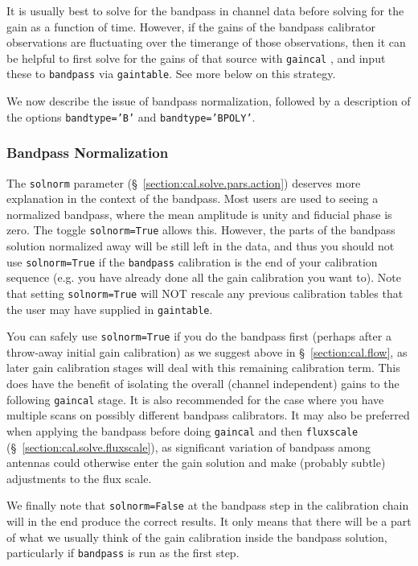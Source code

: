 It is usually best to solve for the bandpass in channel data before
solving for the gain as a function of time.  However, if the gains of
the bandpass calibrator observations are fluctuating over the
timerange of those observations, then it can be helpful to first solve
for the gains of that source with {\tt gaincal} , and input these to
{\tt bandpass} via {\tt gaintable}.  See more below on this strategy.

We now describe the issue of bandpass normalization, followed by
a description of the options {\tt bandtype='B'} and {\tt bandtype='BPOLY'}.

\subsubsection{Bandpass Normalization}
\label{section:cal.solve.band.solnorm}

The {\tt solnorm} parameter (\S~\ref{section:cal.solve.pars.action})
deserves more explanation in the context of the bandpass.  Most users
are used to seeing a normalized bandpass, where the mean amplitude
is unity and fiducial phase is zero. 
The toggle {\tt solnorm=True} allows this.  However, the parts of the
bandpass solution normalized away will be still left in the data,
and thus you should not use {\tt solnorm=True} if the {\tt bandpass}
calibration is the end of your calibration sequence (e.g. you have
already done all the gain calibration you want to).  Note that
setting {\tt solnorm=True} will NOT rescale any previous calibration
tables that the user may have supplied in {\tt gaintable}.

You can safely use {\tt solnorm=True} if you do the bandpass first
(perhaps after a throw-away initial gain calibration) as we suggest above in
\S~\ref{section:cal.flow}, as later gain calibration stages will deal with this
remaining calibration term.  This does have the benefit of isolating
the overall (channel independent) gains to the following {\tt gaincal}
stage.  It is also recommended for the case where you have multiple
scans on possibly different bandpass calibrators.  It may also be 
preferred when applying the bandpass before doing {\tt gaincal} and 
then {\tt fluxscale} (\S~\ref{section:cal.solve.fluxscale}), 
as significant variation of bandpass among antennas could otherwise 
enter the gain solution and make (probably subtle) adjustments to the
flux scale.

We finally note that {\tt solnorm=False} at the bandpass step in the
calibration chain will in the end produce the correct results.  It
only means that there will be a part of what we usually think of the
gain calibration inside the bandpass solution, particularly if
{\tt bandpass} is run as the first step.

